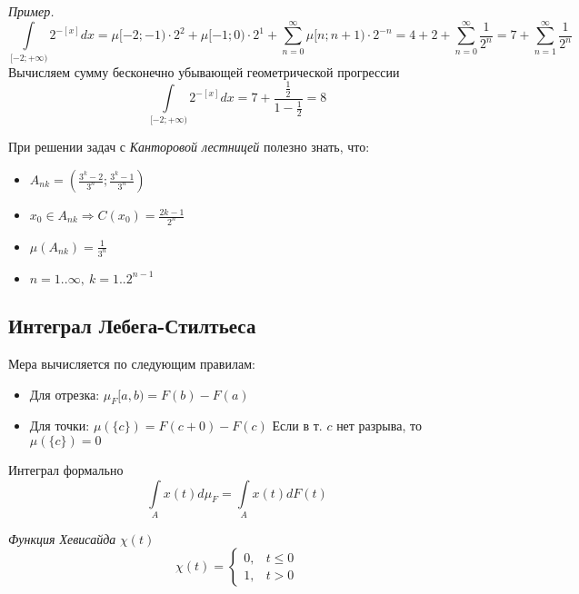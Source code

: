 \documentclass{article}[12pt]
\begin{document}
\par \textit{Пример.}
\begin{displaymath}
    \int\limits_{[-2;+\infty)}2^{-[x]}dx
    =\mu{[-2;-1)}\cdot2^{2} + \mu{[-1;0)}\cdot2^{1}
    + \sum\limits_{n=0}^{\infty}\mu{[n;n+1)}\cdot 2^{-n}
    =4 + 2 + \sum\limits_{n=0}^{\infty}\frac{1}{2^{n}}
    =7 + \sum\limits_{n=1}^{\infty}\frac{1}{2^{n}}
\end{displaymath}
Вычисляем сумму бесконечно убывающей геометрической прогрессии
\begin{displaymath}
    \int\limits_{[-2;+\infty)}2^{-[x]}dx
    = 7 + \frac{\frac{1}{2}}{1-\frac{1}{2}}=8
\end{displaymath}

\par При решении задач с \textit{Канторовой лестницей} полезно знать,
что:
\begin{itemize}
    \item $A_{nk}=\left(\frac{3^{k}-2}{3^{n}};\frac{3^{k}-1}{3^{n}}\right)$
    \item $x_{0}\in A_{nk} \Rightarrow C(x_{0})=\frac{2k-1}{2^{n}}$
    \item $\mu(A_{nk})=\frac{1}{3^{n}}$
    \item $n=1..\infty,\ k=1..2^{n-1}$
\end{itemize}

\subsection{Интеграл Лебега-Стилтьеса}
Мера вычисляется по следующим правилам:
\begin{itemize}
    \item Для отрезка: $\mu_{F}[a,b)=F(b)-F(a)$
    \item Для точки: $\mu(\{c\})=F(c+0)-F(c)$
        \subitem Если в т. $c$ нет разрыва, то $\mu(\{c\})=0$
\end{itemize}
\par Интеграл формально
\begin{displaymath}
    \int\limits_{A}x(t)d\mu_{F}=\int\limits_{A}x(t)dF(t)
\end{displaymath}

\par \textit{Функция Хевисайда} $\chi(t)$
\begin{displaymath}
    \chi(t)=\left\{\begin{array}{ll}
    0, & t \leqslant 0 \\
    1, & t > 0
    \end{array}\right.
\end{displaymath}
\end{document}
